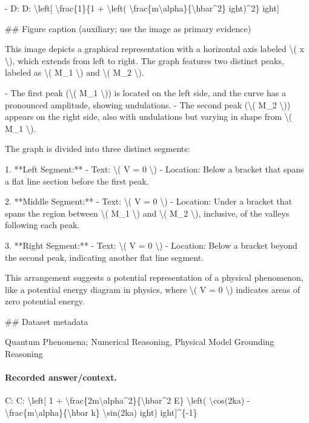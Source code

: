 - D: D: \textbackslash{}left[ \textbackslash{}frac\{1\}\{1 + \textbackslash{}left( \textbackslash{}frac\{m\textbackslash{}alpha\}\{\textbackslash{}hbar\textasciicircum{}2\} 
ight)\textasciicircum{}2\} 
ight]

\#\# Figure caption (auxiliary; use the image as primary evidence)

This image depicts a graphical representation with a horizontal axis labeled \textbackslash{}( x \textbackslash{}), which extends from left to right. The graph features two distinct peaks, labeled as \textbackslash{}( M\_1 \textbackslash{}) and \textbackslash{}( M\_2 \textbackslash{}).

- The first peak (\textbackslash{}( M\_1 \textbackslash{})) is located on the left side, and the curve has a pronounced amplitude, showing undulations.
- The second peak (\textbackslash{}( M\_2 \textbackslash{})) appears on the right side, also with undulations but varying in shape from \textbackslash{}( M\_1 \textbackslash{}).

The graph is divided into three distinct segments:

1. **Left Segment:** 
   - Text: \textbackslash{}( V = 0 \textbackslash{})
   - Location: Below a bracket that spans a flat line section before the first peak.
   
2. **Middle Segment:** 
   - Text: \textbackslash{}( V = 0 \textbackslash{})
   - Location: Under a bracket that spans the region between \textbackslash{}( M\_1 \textbackslash{}) and \textbackslash{}( M\_2 \textbackslash{}), inclusive, of the valleys following each peak.
   
3. **Right Segment:** 
   - Text: \textbackslash{}( V = 0 \textbackslash{})
   - Location: Below a bracket beyond the second peak, indicating another flat line segment.

This arrangement suggests a potential representation of a physical phenomenon, like a potential energy diagram in physics, where \textbackslash{}( V = 0 \textbackslash{}) indicates areas of zero potential energy.

\#\# Dataset metadata

Quantum Phenomena; Numerical Reasoning, Physical Model Grounding Reasoning

\paragraph{Recorded answer/context.}
C: C: \textbackslash{}left[ 1 + \textbackslash{}frac\{2m\textbackslash{}alpha\textasciicircum{}2\}\{\textbackslash{}hbar\textasciicircum{}2 E\} \textbackslash{}left( \textbackslash{}cos(2ka) - \textbackslash{}frac\{m\textbackslash{}alpha\}\{\textbackslash{}hbar k\} \textbackslash{}sin(2ka) 
ight) 
ight]\textasciicircum{}\{-1\}

